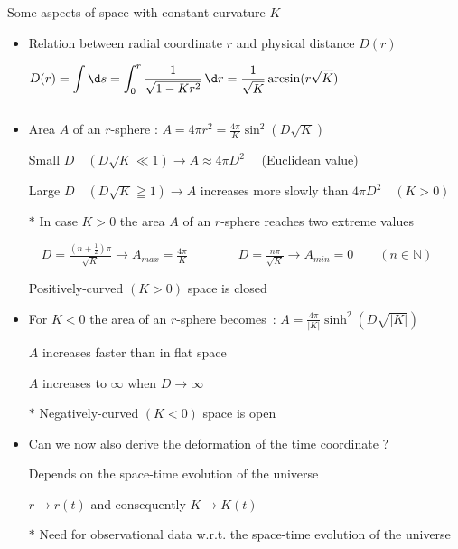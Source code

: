 \Tr
\begin{center}
{\red Some aspects of space with constant curvature $K$}
\end{center}
%
\begin{itemize}
\item Relation between {\blue radial coordinate $r$} and {\blue physical distance $D(r)$}
\item[] $\displaystyle D(r)=\int \d s=\int_{0}^{r} \frac{1}{\sqrt{1-Kr^{2}}}\,\d r
         =\frac{1}{\sqrt{K}} \arcsin(r\sqrt{K})$
\item[] {\red {}} $\qquad$
        {\red {}}
\item Area $A$ of an $r$-sphere : $\displaystyle A=4\pi r^{2}=\frac{4\pi}{K}\sin^{2}(D\sqrt{K})$
\item[] Small $D \quad (D\sqrt{K} \ll 1) \rightarrow A \approx 4\pi D^{2} \quad$ (Euclidean value)
\item[] Large $D \quad (D\sqrt{K} \geqq 1) \rightarrow A$ increases more slowly than $4\pi D^{2} \quad (K>0)$
\item[$\ast$] {\blue In case $K>0$ the area $A$ of an $r$-sphere reaches two extreme values}
\item[] {\blue $\quad \displaystyle D=\frac{(n+\frac{1}{2})\pi}{\sqrt{K}} \rightarrow  A_{max}=\frac{4\pi}{K}
         \qquad \qquad D=\frac{n\pi}{\sqrt{K}} \rightarrow A_{min}=0 \qquad (n \in \mathbb{N})$}
\item[] {\red Positively-curved $(K>0)$ space is closed}
\end{itemize}

\Tr
\begin{itemize}
\item For $K<0$ the area of an $r$-sphere becomes~: $\displaystyle A=\frac{4\pi}{|K|}\sinh^{2}(D\sqrt{|K|})$
\item[] $A$ increases faster than in flat space
\item[] $A$ increases to $\infty$ when $D \rightarrow \infty$
\item[$\ast$] {\red Negatively-curved $(K<0)$ space is open}
\item {\blue Can we now also derive the deformation of the time coordinate ?}
\item[] Depends on the space-time evolution of the universe
\item[] $r \rightarrow r(t)$ and consequently $K \rightarrow K(t)$
\item[$\ast$] Need for observational data w.r.t. the space-time evolution of the universe
\end{itemize}
